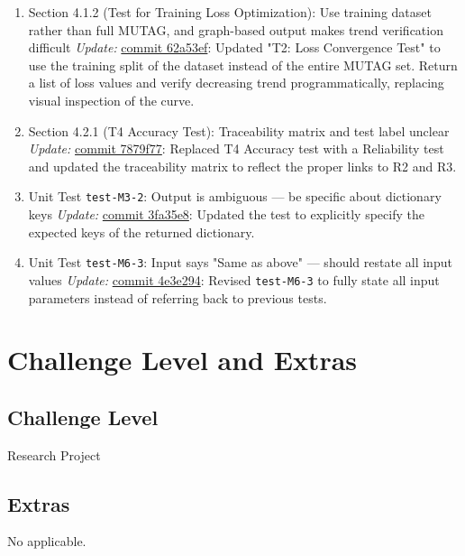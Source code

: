\documentclass{article}
\begin{document}
\begin{enumerate}
    \item Section 4.1.2 (Test for Training Loss Optimization): Use training dataset rather than full MUTAG, and graph-based output makes trend verification difficult 
    \newline \textit{Update:} \href{https://github.com/Yuanqi-X/Re-ProtGNN/commit/62a53ef}{commit 62a53ef}: Updated "T2: Loss Convergence Test" to use the training split of the dataset instead of the entire MUTAG set. Return a list of loss values and verify decreasing trend programmatically, replacing visual inspection of the curve.

    \item Section 4.2.1 (T4 Accuracy Test): Traceability matrix and test label unclear  
    \newline \textit{Update:} \href{https://github.com/Yuanqi-X/Re-ProtGNN/commit/7879f77}{commit 7879f77}: Replaced T4 Accuracy test with a Reliability test and updated the traceability matrix to reflect the proper links to R2 and R3.

    \item Unit Test \texttt{test-M3-2}: Output is ambiguous — be specific about dictionary keys  
    \newline \textit{Update:} \href{https://github.com/Yuanqi-X/Re-ProtGNN/commit/3fa35e8}{commit 3fa35e8}: Updated the test to explicitly specify the expected keys of the returned dictionary.

    \item Unit Test \texttt{test-M6-3}: Input says "Same as above" — should restate all input values  
    \newline \textit{Update:} \href{https://github.com/Yuanqi-X/Re-ProtGNN/commit/4e3e294}{commit 4e3e294}: Revised \texttt{test-M6-3} to fully state all input parameters instead of referring back to previous tests.
\end{enumerate}



\section{Challenge Level and Extras}

\subsection{Challenge Level}
Research Project

\subsection{Extras}
No applicable.
\end{document}
